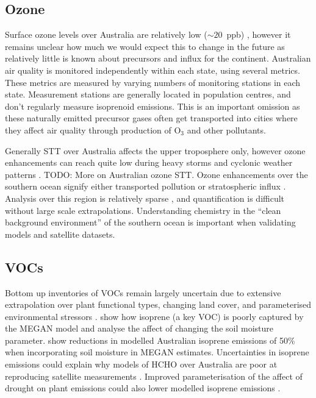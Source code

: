   
  \subsection{Ozone}
    Surface ozone levels over Australia are relatively low ($\sim20$~ppb) \parencite{Young2018}, however it remains unclear how much we would expect this to change in the future as relatively little is known about precursors and influx for the continent.
    Australian air quality is monitored independently within each state, using several metrics.
    These metrics are measured by varying numbers of monitoring stations in each state.
    Measurement stations are generally located in population centres, and don't regularly measure isoprenoid emissions. 
    This is an important omission as these naturally emitted precursor gases often get transported into cities where they affect air quality through production of O$_3$ and other pollutants.
    
    Generally STT over Australia affects the upper troposphere only, however ozone enhancements can reach quite low during heavy storms and cyclonic weather patterns \parencite{Alexander2013}.
    TODO: More on Australian ozone STT.
    Ozone enhancements over the southern ocean signify either transported pollution or stratospheric influx \parencite{Jacobson2000}.
    Analysis over this region is relatively sparse \parencite{Skerlak2014}, and quantification is difficult without large scale extrapolations.
    Understanding chemistry in the ``clean background environment'' of the southern ocean is important when validating models and satellite datasets.
  
  \subsection{VOCs}
    
    Bottom up inventories of VOCs remain largely uncertain due to extensive extrapolation over plant functional types, changing land cover, and parameterised environmental stressors \parencite{Guenther2000,Kanakidou2005,Millet2006}.
    \textcite{Muller2008} show how isoprene (a key VOC) is poorly captured by the MEGAN model and analyse the affect of changing the soil moisture parameter.
    \textcite{Sindelarova2014} show reductions in modelled Australian isoprene emissions of 50\% when incorporating soil moisture in MEGAN estimates. 
    Uncertainties in isoprene emissions could explain why models of HCHO over Australia are poor at reproducing satellite measurements \parencite{Stavrakou2009}.
    Improved parameterisation of the affect of drought on plant emissions could also lower modelled isoprene emissions \parencite{Jiang2018}.
    
